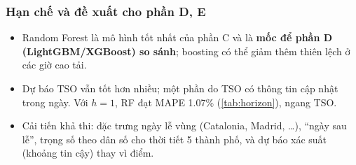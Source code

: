 \subsubsection{Hạn chế và đề xuất cho phần D, E}
\begin{itemize}
  \item Random Forest là mô hình tốt nhất của phần C và là \textbf{mốc để phần D (LightGBM/XGBoost) so sánh};
        boosting có thể giảm thêm thiên lệch ở các giờ cao tải.
  \item Dự báo TSO vẫn tốt hơn nhiều; một phần do TSO có thông tin cập nhật trong ngày. Với $h=1$, RF đạt MAPE
        1.07\% (\cref{tab:horizon}), ngang TSO.
  \item Cải tiến khả thi: đặc trưng ngày lễ vùng (Catalonia, Madrid, \dots), ``ngày sau lễ'', trọng số theo dân số
        cho thời tiết 5 thành phố, và dự báo xác suất (khoảng tin cậy) thay vì điểm.
\end{itemize}
